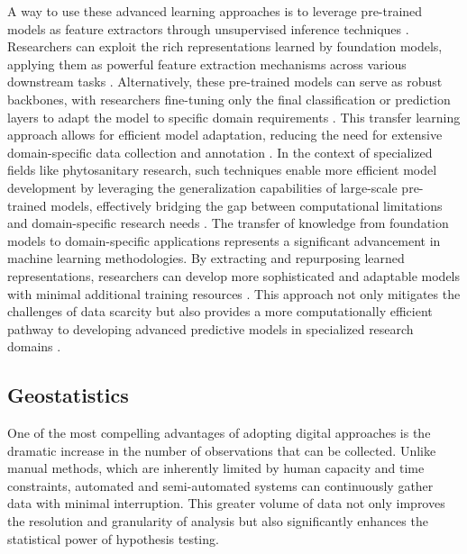 \documentclass[12pt,a4paper,oneside]{report}
\begin{document}
A way to use these advanced learning approaches is to leverage pre-trained models as feature extractors through unsupervised 
inference techniques \cite{chen_simple_2020}. Researchers can exploit the rich representations learned by foundation models, 
applying them as powerful feature extraction mechanisms across various downstream tasks \cite{devlin_bert_2019}. Alternatively, 
these pre-trained models can serve as robust backbones, with researchers fine-tuning only the final classification or 
prediction layers to adapt the model to specific domain requirements \cite{he_momentum_2020}. This transfer learning 
approach allows for efficient model adaptation, reducing the need for extensive domain-specific data collection and 
annotation \cite{kornblith_better_2019}. In the context of specialized fields like phytosanitary research, such 
techniques enable more efficient model development by leveraging the generalization capabilities of large-scale 
pre-trained models, effectively bridging the gap between computational limitations and domain-specific research 
needs \cite{razavian_cnn_2014}.
The transfer of knowledge from foundation models to domain-specific applications represents a significant advancement 
in machine learning methodologies. By extracting and repurposing learned representations, researchers can develop 
more sophisticated and adaptable models with minimal additional training resources \cite{zoph_rethinking_2020}. 
This approach not only mitigates the challenges of data scarcity but also provides a more computationally 
efficient pathway to developing advanced predictive models in specialized research domains \cite{tan_efficientnet_2020}.

\subsection{Geostatistics}

One of the most compelling advantages of adopting digital approaches is the
dramatic increase in the number of observations that can be collected. Unlike
manual methods, which are inherently limited by human capacity and time
constraints, automated and semi-automated systems can continuously gather data
with minimal interruption. This greater volume of data not only improves the
resolution and granularity of analysis but also significantly enhances the
statistical power of hypothesis testing.
\end{document}
